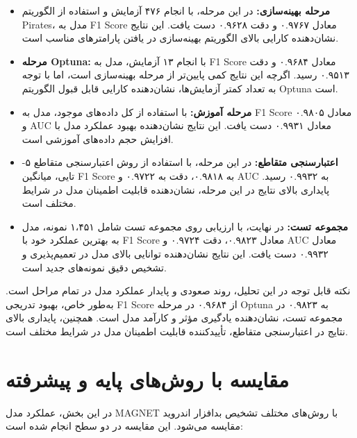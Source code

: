 \begin{itemize}
    \item \textbf{مرحله بهینه‌سازی:} در این مرحله، با انجام ۴۷۶ آزمایش و استفاده از الگوریتم Pirates، مدل به F1 Score معادل ۰.۹۷۶۷ و دقت ۰.۹۶۲۸ دست یافت. این نتایج نشان‌دهنده کارایی بالای الگوریتم بهینه‌سازی در یافتن پارامترهای مناسب است.
    
    \item \textbf{مرحله Optuna:} با انجام ۱۳ آزمایش، مدل به F1 Score معادل ۰.۹۶۸۴ و دقت ۰.۹۵۱۳ رسید. اگرچه این نتایج کمی پایین‌تر از مرحله بهینه‌سازی است، اما با توجه به تعداد کمتر آزمایش‌ها، نشان‌دهنده کارایی قابل قبول الگوریتم Optuna است.
    
    \item \textbf{مرحله آموزش:} با استفاده از کل داده‌های موجود، مدل به F1 Score معادل ۰.۹۸۰۵ و AUC معادل ۰.۹۹۳۱ دست یافت. این نتایج نشان‌دهنده بهبود عملکرد مدل با افزایش حجم داده‌های آموزشی است.
    
    \item \textbf{اعتبارسنجی متقاطع:} در این مرحله، با استفاده از روش اعتبارسنجی متقاطع ۵-تایی، میانگین F1 Score به ۰.۹۸۱۸، دقت به ۰.۹۷۲۲ و AUC به ۰.۹۹۳۲ رسید. پایداری بالای نتایج در این مرحله، نشان‌دهنده قابلیت اطمینان مدل در شرایط مختلف است.
    
    \item \textbf{مجموعه تست:} در نهایت، با ارزیابی روی مجموعه تست شامل ۱،۴۵۱ نمونه، مدل به بهترین عملکرد خود با F1 Score معادل ۰.۹۸۲۳، دقت ۰.۹۷۲۴ و AUC معادل ۰.۹۹۳۲ دست یافت. این نتایج نشان‌دهنده توانایی بالای مدل در تعمیم‌پذیری و تشخیص دقیق نمونه‌های جدید است.
\end{itemize}

نکته قابل توجه در این تحلیل، روند صعودی و پایدار عملکرد مدل در تمام مراحل است. به‌طور خاص، بهبود تدریجی F1 Score از ۰.۹۶۸۴ در مرحله Optuna به ۰.۹۸۲۳ در مجموعه تست، نشان‌دهنده یادگیری مؤثر و کارآمد مدل است. همچنین، پایداری بالای نتایج در اعتبارسنجی متقاطع، تأییدکننده قابلیت اطمینان مدل در شرایط مختلف است.

\section{مقایسه با روش‌های پایه و پیشرفته}
در این بخش، عملکرد مدل MAGNET با روش‌های مختلف تشخیص بدافزار اندروید مقایسه می‌شود. این مقایسه در دو سطح انجام شده است:

